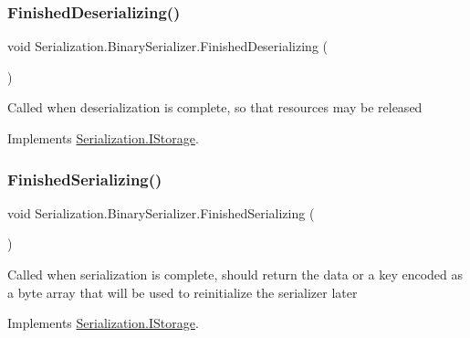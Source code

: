 \subsubsection{\texorpdfstring{Finished\+Deserializing()}{FinishedDeserializing()}}
{\footnotesize\ttfamily void Serialization.\+Binary\+Serializer.\+Finished\+Deserializing (\begin{DoxyParamCaption}{ }\end{DoxyParamCaption})\hspace{0.3cm}{\ttfamily [inline]}}



Called when deserialization is complete, so that resources may be released 



Implements \hyperlink{interface_serialization_1_1_i_storage_affc5c4e5bc5efaf0f1840943358b6bc9}{Serialization.\+I\+Storage}.

\mbox{\label{class_serialization_1_1_binary_serializer_a33f7f74fffe31b07a96ab08fa545e990}} 
\subsubsection{\texorpdfstring{Finished\+Serializing()}{FinishedSerializing()}}
{\footnotesize\ttfamily void Serialization.\+Binary\+Serializer.\+Finished\+Serializing (\begin{DoxyParamCaption}{ }\end{DoxyParamCaption})\hspace{0.3cm}{\ttfamily [inline]}}



Called when serialization is complete, should return the data or a key encoded as a byte array that will be used to reinitialize the serializer later 



Implements \hyperlink{interface_serialization_1_1_i_storage_a5a9811117c5fba81ff98854cfa2c48e1}{Serialization.\+I\+Storage}.

\mbox{\label{class_serialization_1_1_binary_serializer_a026959038d36c07fc77d6da1345ab4d2}} 
